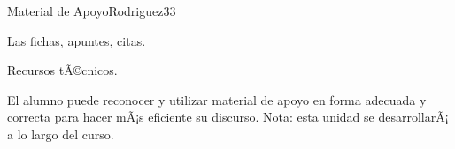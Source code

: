 \begin{syllabus}
\begin{unit}{Material de Apoyo}{Rodriguez}{3}{3}
\begin{topics}
	\item Las fichas, apuntes, citas.
	\item Recursos tÃ©cnicos.
\end{topics}
\begin{unitgoals}
	\item El alumno puede reconocer y utilizar material de apoyo en forma adecuada y correcta para hacer mÃ¡s eficiente su discurso. Nota: esta unidad se desarrollarÃ¡ a lo largo del curso.
\end{unitgoals}
\end{unit}



\begin{coursebibliography}
\end{coursebibliography}
\end{syllabus}
